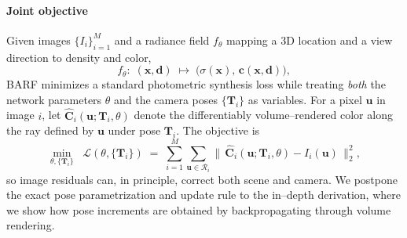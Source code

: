 \begin{enrichment}
\begin{enrichment}
        \paragraph{Joint objective}
        Given images $\{I_i\}_{i=1}^M$ and a radiance field $f_\theta$ mapping a 3D location and a view direction to density and color,
        \[
        f_\theta:\;(\mathbf{x},\mathbf{d}) \;\mapsto\; \big(\sigma(\mathbf{x}),\,\mathbf{c}(\mathbf{x},\mathbf{d})\big),
        \]
        BARF minimizes a standard photometric synthesis loss while treating \emph{both} the network parameters $\theta$ and the camera poses $\{\mathbf{T}_i\}$ as variables. For a pixel $\mathbf{u}$ in image $i$, let $\widehat{\mathbf{C}}_i(\mathbf{u};\mathbf{T}_i,\theta)$ denote the differentiably volume–rendered color along the ray defined by $\mathbf{u}$ under pose $\mathbf{T}_i$. The objective is
        \begin{equation}
            \min_{\theta,\{\mathbf{T}_i\}} \;\; 
            \mathcal{L}(\theta,\{\mathbf{T}_i\})
            \;=\;
            \sum_{i=1}^M \sum_{\mathbf{u}\in\mathcal{R}_i}
            \Big\|\,
            \widehat{\mathbf{C}}_i(\mathbf{u};\mathbf{T}_i,\theta)-I_i(\mathbf{u})
            \,\Big\|_2^2,
            \label{eq:barf_joint_objective}
        \end{equation}
        so image residuals can, in principle, correct both scene and camera. We postpone the exact pose parametrization and update rule to the in–depth derivation, where we show how pose increments are obtained by backpropagating through volume rendering.
        

\end{enrichment}
\end{enrichment}
